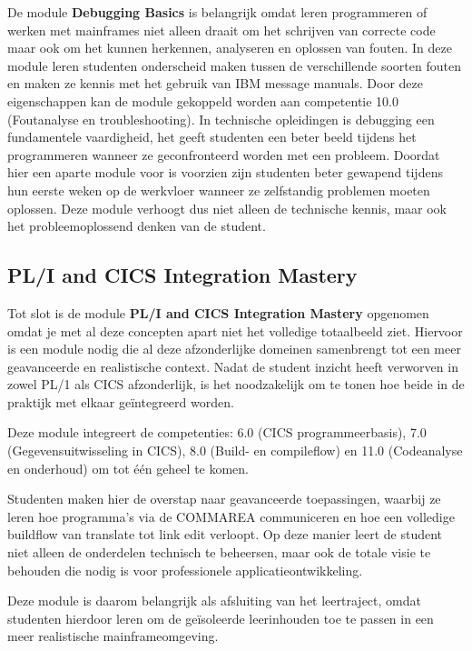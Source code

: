 De module \textbf{Debugging Basics} is belangrijk omdat leren programmeren of werken met mainframes niet alleen draait om het schrijven van correcte code maar ook om het kunnen herkennen, analyseren en oplossen van fouten.
In deze module leren studenten onderscheid maken tussen de verschillende soorten fouten en maken ze kennis met het gebruik van IBM message manuals.
Door deze eigenschappen kan de module gekoppeld worden aan competentie 10.0 (Foutanalyse en troubleshooting).
In technische opleidingen is debugging een fundamentele vaardigheid, het geeft studenten een beter beeld tijdens het programmeren wanneer ze geconfronteerd worden met een probleem.
Doordat hier een aparte module voor is voorzien zijn studenten beter gewapend tijdens hun eerste weken op de werkvloer wanneer ze zelfstandig problemen moeten oplossen.
Deze module verhoogt dus niet alleen de technische kennis, maar ook het probleemoplossend denken van de student.


\subsection{PL/I and CICS Integration Mastery}%
\label{sec:mastery-pl1cics}

Tot slot is de module \textbf{PL/I and CICS Integration Mastery} opgenomen omdat je met al deze concepten apart niet het volledige totaalbeeld ziet.
Hiervoor is een module nodig die al deze afzonderlijke domeinen samenbrengt tot een meer geavanceerde en realistische context.
Nadat de student inzicht heeft verworven in zowel PL/1 als CICS afzonderlijk, is het noodzakelijk om te tonen hoe beide in de praktijk met elkaar geïntegreerd worden.

Deze module integreert de competenties: 6.0 (CICS programmeerbasis), 7.0 (Gegevensuitwisseling in CICS), 8.0 (Build- en compileflow) en 11.0 (Codeanalyse en onderhoud) om tot één geheel te komen.

Studenten maken hier de overstap naar geavanceerde toepassingen, waarbij ze leren hoe programma’s via de COMMAREA communiceren en hoe een volledige buildflow van translate tot link edit verloopt.
Op deze manier leert de student niet alleen de onderdelen technisch te beheersen, maar ook de totale visie te behouden die nodig is voor professionele applicatieontwikkeling.

Deze module is daarom belangrijk als afsluiting van het leertraject, omdat studenten hierdoor leren om de geïsoleerde leerinhouden toe te passen in een meer realistische mainframeomgeving. 

